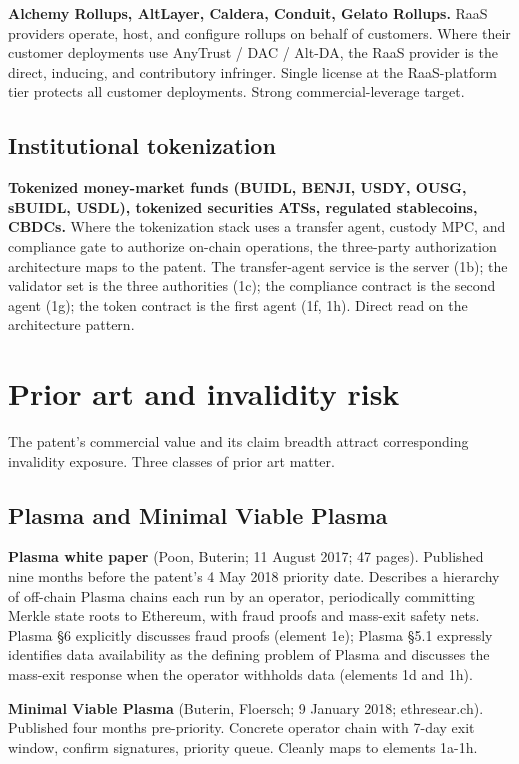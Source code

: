 \documentclass[11pt,letterpaper]{article}
\begin{document}
\textbf{Alchemy Rollups, AltLayer, Caldera, Conduit, Gelato Rollups.} RaaS providers operate, host, and configure rollups on behalf of customers. Where their customer deployments use AnyTrust / DAC / Alt-DA, the RaaS provider is the direct, inducing, and contributory infringer. Single license at the RaaS-platform tier protects all customer deployments. Strong commercial-leverage target.

\subsection{Institutional tokenization}

\textbf{Tokenized money-market funds (BUIDL, BENJI, USDY, OUSG, sBUIDL, USDL), tokenized securities ATSs, regulated stablecoins, CBDCs.} Where the tokenization stack uses a transfer agent, custody MPC, and compliance gate to authorize on-chain operations, the three-party authorization architecture maps to the patent. The transfer-agent service is the server (1b); the validator set is the three authorities (1c); the compliance contract is the second agent (1g); the token contract is the first agent (1f, 1h). Direct read on the architecture pattern.

\section{Prior art and invalidity risk}

The patent's commercial value and its claim breadth attract corresponding invalidity exposure. Three classes of prior art matter.

\subsection{Plasma and Minimal Viable Plasma}

\textbf{Plasma white paper} (Poon, Buterin; 11 August 2017; 47 pages). Published nine months before the patent's 4 May 2018 priority date. Describes a hierarchy of off-chain Plasma chains each run by an operator, periodically committing Merkle state roots to Ethereum, with fraud proofs and mass-exit safety nets. Plasma §6 explicitly discusses fraud proofs (element 1e); Plasma §5.1 expressly identifies data availability as the defining problem of Plasma and discusses the mass-exit response when the operator withholds data (elements 1d and 1h).

\textbf{Minimal Viable Plasma} (Buterin, Floersch; 9 January 2018; ethresear.ch). Published four months pre-priority. Concrete operator chain with 7-day exit window, confirm signatures, priority queue. Cleanly maps to elements 1a-1h.
\end{document}
